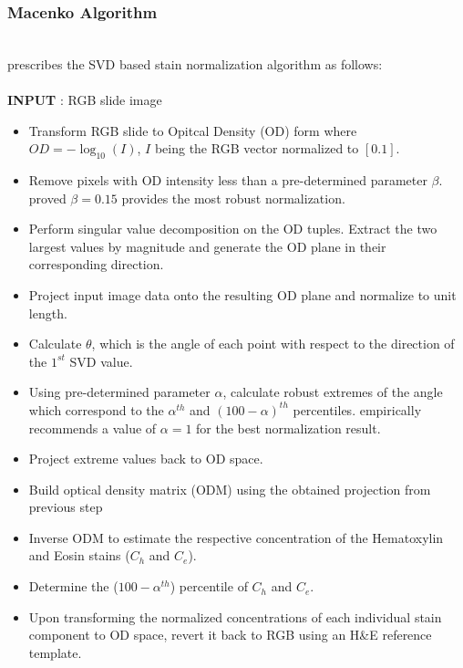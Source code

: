 \documentclass{l4proj}
\begin{document}
\subsubsection{Macenko Algorithm}
\hfill\\
\cite{macenko2009method} prescribes the SVD based stain normalization algorithm as follows:\\
\\
\textbf{INPUT} : RGB slide image
\begin{itemize}
    \item Transform RGB slide to Opitcal Density (OD) form where \(OD = -\log_{10}(I)\), \(I\) being the RGB vector normalized to \([0.1]\).
    \item Remove pixels with OD intensity less than a pre-determined parameter \(\beta\). \cite{macenko2009method} proved \(\beta = 0.15\) provides the most robust normalization.
    \item Perform singular value decomposition on the OD tuples. Extract the two largest values by magnitude and generate the OD plane in their corresponding direction.
    \item Project input image data onto the resulting OD plane and normalize to unit length.
    \item Calculate \(\theta\), which is the angle of each point with respect to the direction of the \(1^{st}\) SVD value.
    \item Using pre-determined parameter \(\alpha\), calculate robust extremes of the angle which correspond to the \(\alpha^{th}\) and \((100 - \alpha)^{th}\) percentiles. \cite{macenko2009method} empirically recommends a value of \(\alpha = 1\) for the best normalization result. 
    \item Project extreme values back to OD space.
    \item Build optical density matrix (ODM) using the obtained projection from previous step
    \item Inverse ODM to estimate the respective concentration of the Hematoxylin and Eosin stains (\(C_h\) and \(C_e\)). 
    \item Determine the (\(100 - \alpha^{th}\)) percentile of \(C_h\) and \(C_e\).
    \item Upon transforming the normalized concentrations of each individual stain component to OD space, revert it back to RGB using an H\&E reference template. 
\end{itemize}
\end{document}
